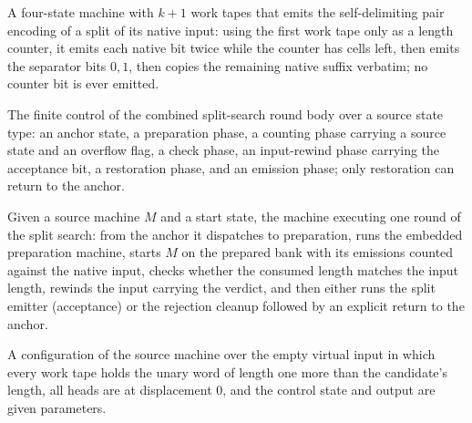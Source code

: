 \begin{definition}
\label{Turing.FinTM.splitEmitTM}
\leanok
{}
A four-state machine with $k+1$ work tapes that emits the self-delimiting
pair encoding of a split of its native input: using the first work tape only
as a length counter, it emits each native bit twice while the counter has
cells left, then emits the separator bits $0,1$, then copies the remaining
native suffix verbatim; no counter bit is ever emitted.
\end{definition}

\begin{definition}
\label{Turing.FinTM.SplitBodyState}
\leanok
The finite control of the combined split-search round body over a source
state type: an anchor state, a preparation phase, a counting phase carrying a
source state and an overflow flag, a check phase, an input-rewind phase
carrying the acceptance bit, a restoration phase, and an emission phase; only
restoration can return to the anchor.
\end{definition}

\begin{definition}
\label{Turing.FinTM.splitBodyTM}
\leanok
{}
Given a source machine $M$ and a start state, the machine executing one round
of the split search: from the anchor it dispatches to preparation, runs the
embedded preparation machine, starts $M$ on the prepared bank with its
emissions counted against the native input, checks whether the consumed
length matches the input length, rewinds the input carrying the verdict, and
then either runs the split emitter (acceptance) or the rejection cleanup
followed by an explicit return to the anchor.
\end{definition}

\begin{definition}
\label{Turing.FinTM.splitBank}
\leanok
{}
A configuration of the source machine over the empty virtual input in which
every work tape holds the unary word of length one more than the candidate's
length, all heads are at displacement $0$, and the control state and output
are given parameters.
\end{definition}

